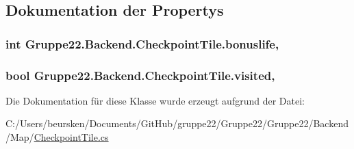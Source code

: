 \subsection{Dokumentation der Propertys}
\hypertarget{class_gruppe22_1_1_backend_1_1_checkpoint_tile_a4d7e2b4d2acf6d1ca8cff38851e070b7}{
\subsubsection[{bonuslife}]{\setlength{\rightskip}{0pt plus 5cm}int Gruppe22.\-Backend.\-Checkpoint\-Tile.\-bonuslife\hspace{0.3cm}{\ttfamily [get]}, {\ttfamily [set]}}}\label{class_gruppe22_1_1_backend_1_1_checkpoint_tile_a4d7e2b4d2acf6d1ca8cff38851e070b7}
\hypertarget{class_gruppe22_1_1_backend_1_1_checkpoint_tile_a3bbecce1496a23490a6034cb194e6882}{
\subsubsection[{visited}]{\setlength{\rightskip}{0pt plus 5cm}bool Gruppe22.\-Backend.\-Checkpoint\-Tile.\-visited\hspace{0.3cm}{\ttfamily [get]}, {\ttfamily [set]}}}\label{class_gruppe22_1_1_backend_1_1_checkpoint_tile_a3bbecce1496a23490a6034cb194e6882}


Die Dokumentation für diese Klasse wurde erzeugt aufgrund der Datei\-:\begin{DoxyCompactItemize}
\item 
C\-:/\-Users/beursken/\-Documents/\-Git\-Hub/gruppe22/\-Gruppe22/\-Gruppe22/\-Backend/\-Map/\hyperlink{_checkpoint_tile_8cs}{Checkpoint\-Tile.\-cs}\end{DoxyCompactItemize}
